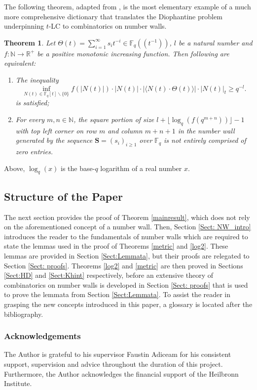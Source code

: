 \documentclass{article}
\newtheorem{theorem}{Theorem}[subsection]
\theoremstyle{definition}
\newcommand{\F}{\mathbb{F}}
\numberwithin{equation}{subsection}
\begin{document}
\noindent The following theorem, adapted from \cite[Theorem 2.2]{Faustin}, is the most elementary example of a much more comprehensive dictionary that translates the Diophantine problem underpinning $t$-LC to combinatorics on number walls. 

\begin{theorem}\label{growth}
    Let $\Theta(t)=\sum_{i=1}^\infty s_it^{-i}\in{\F_q}\left(\!\left(t^{-1}\right)\!\right)$, $l$ be a natural number and $f:\mathbb{N}\to\mathbb{R}^+$ be a positive monotonic increasing function. Then following are equivalent: 
\begin{enumerate}
    \item The inequality \[\inf_{N(t)\in\F_q[t]\backslash\{0\}}f(|N(t)|)\cdot |N(t)|\cdot |\langle N(t)\cdot \Theta(t) \rangle|\cdot |N(t)|_t\ge q^{-l}.\] is satisfied;
    \item For every $m,n\in\mathbb{N}$, the square portion of size $l+\lfloor\log_q(f(q^{m+n}))\rfloor-1$ with top left corner on row $m$ and column $m+n+1$ in the number wall generated by the sequence $\mathbf{S}=(s_i)_{i\ge1}$ over $\F_q$ is not entirely comprised of zero entries.
\end{enumerate}
\end{theorem}

 \noindent Above, $\log_q(x)$ is the base-$q$ logarithm of a real number $x$. 

\subsection{Structure of the Paper}
 \noindent The next section provides the proof of Theorem \ref{mainresult}, which does not rely on the aforementioned concept of a number wall. Then, Section \ref{Sect: NW_intro} introduces the reader to the fundamentals of number walls which are required to state the lemmas used in the proof of Theorems \ref{metric} and \ref{log2}. These lemmas are provided in Section \ref{Sect:Lemmata}, but their proofs are relegated to Section \ref{Sect: proofs}. Theorems \ref{log2} and \ref{metric} are then proved in Sections \ref{Sect:HD} and \ref{Sect:Khint} respectively, before an extensive theory of combinatorics on number walls is developed in Section \ref{Sect: proofs} that is used to prove the lemmata from Section \ref{Sect:Lemmata}. To assist the reader in grasping the new concepts introduced in this paper, a glossary is located after the bibliography. 
 
\subsubsection*{Acknowledgements} \noindent The Author is grateful to his supervisor Faustin Adiceam for his consistent support, supervision and advice throughout the duration of this project. Furthermore, the Author acknowledges the financial support of the Heilbronn Institute.
\end{document}
